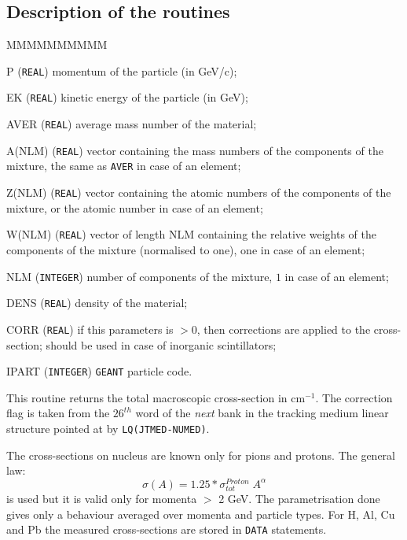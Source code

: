 \subsection{Description of the routines }
\begin{DLtt}{MMMMMMMMMM}
\item[P] ({\tt REAL}) momentum of the particle (in GeV/c);
\item[EK] ({\tt REAL}) kinetic energy of the particle (in GeV);
\item[AVER] ({\tt REAL}) average mass number of the material;
\item[A(NLM)] ({\tt REAL}) vector containing the mass numbers 
of the components of the mixture, the same as {\tt AVER} in case of an
element;
\item[Z(NLM)] ({\tt REAL}) vector containing the atomic numbers of the
components of the mixture, or the atomic number in case of an element;
\item[W(NLM)] ({\tt REAL}) vector of length NLM containing the relative weights
of  the  components of the mixture (normalised to one), one in case of an
element;
\item[NLM]  ({\tt INTEGER}) number of components of the mixture, $1$ in case 
of an element;
\item[DENS]  ({\tt REAL}) density of the material;
\item[CORR]  ({\tt REAL}) if this parameters is $>0$, then corrections are
applied to the cross-section; should be used in case of inorganic 
scintillators;
\item[IPART] ({\tt INTEGER}) {\tt GEANT} particle code.
\end{DLtt}
This routine returns the total macroscopic cross-section in cm$^{-1}$. 
The correction flag is taken from the $26^{th}$ word of the {\it next}
bank in the tracking medium linear structure pointed at by 
{\tt LQ(JTMED-NUMED)}.
 
The cross-sections on nucleus are known only for pions and protons. The
general law:
\[
\sigma(A) = 1.25*\sigma_{tot}^{Proton} \; A^\alpha
\]
is used but it is valid only for momenta $>$ 2 GeV. The parametrisation done
gives only a behaviour averaged over momenta and particle types. 
For H, Al, Cu and Pb the measured cross-sections are
stored in {\tt DATA} statements.
 
